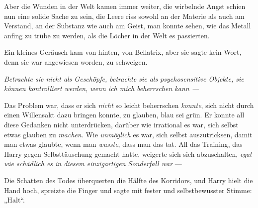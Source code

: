 Aber die Wunden in der Welt kamen immer weiter, die wirbelnde Angst schien nun eine solide Sache zu sein, die Leere riss sowohl an der Materie als auch am Verstand, an der Substanz wie auch am Geist, man konnte sehen, wie das Metall anfing zu trübe zu werden, als die Löcher in der Welt es passierten.

Ein kleines Geräusch kam von hinten, von Bellatrix, aber sie sagte kein Wort, denn sie war angewiesen worden, zu schweigen.

\emph{Betrachte sie nicht als Geschöpfe, betrachte sie als psychosensitive Objekte, sie können kontrolliert werden, wenn ich mich beherrschen kann —}

Das Problem war, dass er sich \emph{nicht} so leicht beherrschen \emph{konnte}, sich nicht durch einen Willensakt dazu bringen konnte, zu glauben, blau sei grün. Er konnte all diese Gedanken nicht unterdrücken, darüber wie irrational es war, sich selbst etwas glauben zu \emph{machen}. Wie \emph{unmöglich} es war, sich selbst auszutricksen, damit man etwas glaubte, wenn man \emph{wusste}, dass man das tat. All das Training, das Harry gegen Selbsttäuschung gemacht hatte, weigerte sich sich abzuschalten, \emph{egal wie schädlich es in diesem einzigartigen Sonderfall war} —

Die Schatten des Todes überquerten die Hälfte des Korridors, und Harry hielt die Hand hoch, spreizte die Finger und sagte mit fester und selbstbewusster Stimme:
„Halt“.


